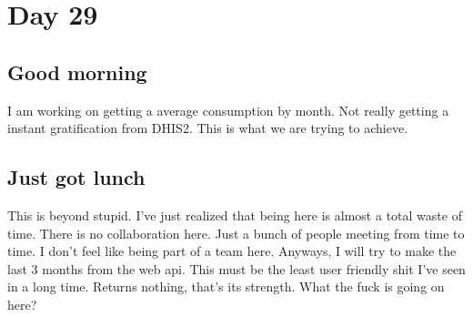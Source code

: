 \section{Day 29}
\subsection{Good morning}
I am working on getting a average consumption by month.
Not really getting a instant gratification from DHIS2.
This is what we are trying to achieve.
\subsection{Just got lunch}
This is beyond stupid. I've just realized that being here is almost a total waste of time.
There is no collaboration here. Just a bunch of people meeting from time to time.
I don't feel like being part of a team here.
Anyways, I will try to make the last 3 months from the web api.
This must be the least user friendly shit I've seen in a long time.
Returns nothing, that's its strength.
What the fuck is going on here?


